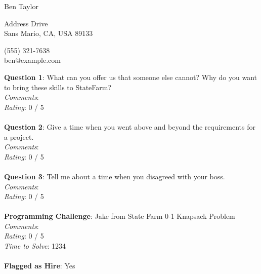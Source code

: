 \documentclass[12pt]{article}
\begin{document}
{\LARGE \begin{center}Ben Taylor\end{center}}

\begin{multicols}{2}
 Address Drive \\
Sans Mario, CA, USA 89133
\columnbreak

\noindent
(555) 321-7638 \\
ben@example.com
\end{multicols}

\noindent
\textbf{Question 1}: What can you offer us that someone else cannot? Why do you want to bring these skills to StateFarm?
\\\noindent
\textit{Comments}: 
\\\noindent
\textit{Rating}: 0 / 5 
\\\\
\noindent
\textbf{Question 2}: Give a time when you went above and beyond the requirements for a project.
\\\noindent
\textit{Comments}: 
\\\noindent
\textit{Rating}: 0 / 5 
\\\\
\noindent
\textbf{Question 3}: Tell me about a time when you disagreed with your boss.
\\\noindent
\textit{Comments}: 
\\\noindent
\textit{Rating}: 0 / 5 
\\\\
\noindent
\textbf{Programming Challenge}: Jake from State Farm 0-1 Knapsack Problem
\\\noindent
\textit{Comments}: 
\\\noindent
\textit{Rating}: 0 / 5 
\\\noindent
\textit{Time to Solve}: 1234
\\\\
\textbf{Flagged as Hire}: Yes
\\\\ 
\end{document}
